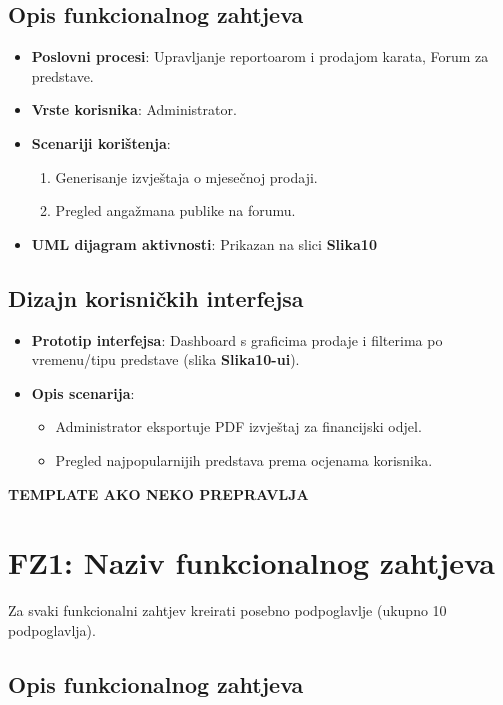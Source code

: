 \subsection{Opis funkcionalnog zahtjeva}  
\begin{itemize}  
    \item \textbf{Poslovni procesi}: Upravljanje reportoarom i prodajom karata, Forum za predstave.  
    \item \textbf{Vrste korisnika}: Administrator.  
    \item \textbf{Scenariji korištenja}:  
        \begin{enumerate}  
            \item Generisanje izvještaja o mjesečnoj prodaji.  
            \item Pregled angažmana publike na forumu.  
        \end{enumerate}  
    \item \textbf{UML dijagram aktivnosti}: Prikazan na slici \textbf{Slika10}  
\end{itemize}  

\sloppy  
\subsection{Dizajn korisničkih interfejsa}  
\begin{itemize}  
    \item \textbf{Prototip interfejsa}: Dashboard s graficima prodaje i filterima po vremenu/tipu predstave (slika \textbf{Slika10-ui}).  
    \item \textbf{Opis scenarija}:  
        \begin{itemize}  
            \item Administrator eksportuje PDF izvještaj za financijski odjel.  
            \item Pregled najpopularnijih predstava prema ocjenama korisnika.  
        \end{itemize}  
\end{itemize}  

\sloppy
\textbf{TEMPLATE AKO NEKO PREPRAVLJA}
\section{FZ1: Naziv funkcionalnog zahtjeva}

Za svaki funkcionalni zahtjev kreirati posebno podpoglavlje (ukupno 10 podpoglavlja).

\sloppy
\subsection{Opis funkcionalnog zahtjeva}

